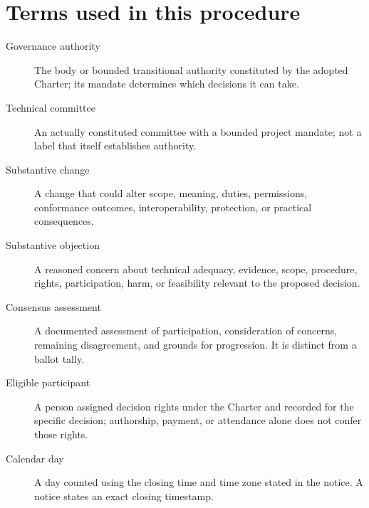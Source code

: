 \documentclass[11pt,a4paper]{article}
\begin{document}
\section{Terms used in this procedure}
\begin{description}
\item[Governance authority] The body or bounded transitional authority constituted by the adopted Charter; its mandate determines which decisions it can take.
\item[Technical committee] An actually constituted committee with a bounded project mandate; not a label that itself establishes authority.
\item[Substantive change] A change that could alter scope, meaning, duties, permissions, conformance outcomes, interoperability, protection, or practical consequences.
\item[Substantive objection] A reasoned concern about technical adequacy, evidence, scope, procedure, rights, participation, harm, or feasibility relevant to the proposed decision.
\item[Consensus assessment] A documented assessment of participation, consideration of concerns, remaining disagreement, and grounds for progression. It is distinct from a ballot tally.
\item[Eligible participant] A person assigned decision rights under the Charter and recorded for the specific decision; authorship, payment, or attendance alone does not confer those rights.
\item[Calendar day] A day counted using the closing time and time zone stated in the notice. A notice states an exact closing timestamp.
\end{description}
\end{document}
